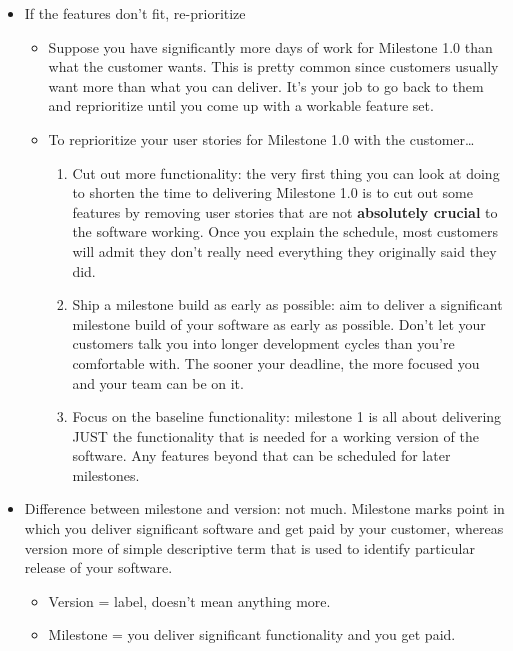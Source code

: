 \documentclass[letterpaper]{article}
\begin{document}
\begin{itemize}
\begin{itemize}
        \item If the features don't fit, re-prioritize 
        \begin{itemize}
            \item Suppose you have significantly more days of work for Milestone 1.0 than what the customer wants. This is pretty common since customers usually want more than what you can deliver. It's your job to go back to them and reprioritize until you come up with a workable feature set. 
            \item To reprioritize your user stories for Milestone 1.0 with the customer\dots
            \begin{enumerate}
                \item Cut out more functionality: the very first thing you can look at doing to shorten the time to delivering Milestone 1.0 is to cut out some features by removing user stories that are not \textbf{absolutely crucial} to the software working. Once you explain the schedule, most customers will admit they don't really need everything they originally said they did. 
                \item Ship a milestone build as early as possible: aim to deliver a significant milestone build of your software as early as possible. Don't let your customers talk you into longer development cycles than you're comfortable with. The sooner your deadline, the more focused you and your team can be on it. 
                \item Focus on the baseline functionality: milestone 1 is all about delivering JUST the functionality that is needed for a working version of the software. Any features beyond that can be scheduled for later milestones. 
            \end{enumerate}
        \end{itemize}

        \item Difference between milestone and version: not much. Milestone marks point in which you deliver significant software and get paid by your customer, whereas version more of simple descriptive term that is used to identify particular release of your software. 
        \begin{itemize}
            \item Version = label, doesn't mean anything more. 
            \item Milestone = you deliver significant functionality and you get paid. 
        \end{itemize}


\end{itemize}
\end{itemize}
\end{document}
